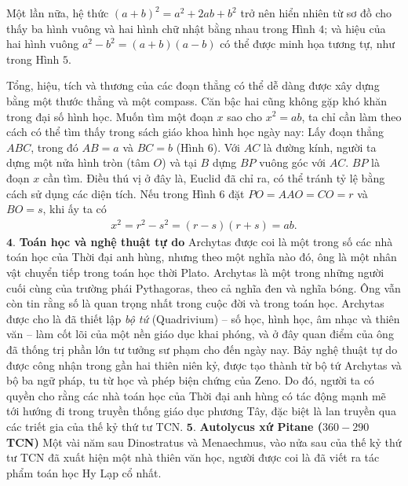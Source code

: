 \begin{multicols}{2}
	Một lần nữa, hệ thức $(a+ b)^2 = a^2 + 2ab + b^2$  trở nên hiển nhiên từ sơ đồ cho thấy ba hình vuông và hai hình chữ nhật bằng nhau trong Hình $4$; và hiệu của hai hình vuông $a^2 - b^2 = (a + b)(a-b)$  có thể được minh họa tương tự, như trong Hình $5$. 
	
	Tổng, hiệu, tích và thương của các đoạn thẳng có thể dễ dàng được xây dựng bằng một thước thẳng và một compass.  
	\vskip 0.1cm
	Căn bậc hai cũng không gặp khó khăn trong đại số hình học.  Muốn tìm một đoạn $x$  sao cho $x^2 = ab$, ta chỉ cần làm theo cách có thể tìm thấy trong sách giáo khoa hình học ngày nay: Lấy đoạn thẳng  $ABC$, trong đó $AB = a$  và $BC = b$  (Hình $6$). Với $AC$ là đường kính, người ta dựng một nửa hình tròn (tâm  $O$) và tại $B$  dựng  $BP$ vuông góc với $AC$. $BP$ là đoạn  $x$ cần tìm. 
	\vskip 0.1cm
	Điều thú vị ở đây là, Euclid đã chỉ ra, có thể tránh tỷ lệ bằng cách sử dụng các diện tích.
	\vskip 0.1cm
	Nếu trong Hình $6$ đặt $PO = AAO = CO =r$  và $BO = s$,  khi ấy ta có 
	\begin{align*}
		x^2 = r^2 - s^2 = (r-s)(r+s) = ab.
	\end{align*}
	$\pmb{4.}$ \textbf{\color{lichsutoanhoc}Toán học và nghệ thuật tự do} 
	\vskip 0.1cm
	Archytas được coi là một trong số các nhà toán học của Thời đại anh hùng, nhưng theo một nghĩa nào đó, ông là một nhân vật chuyển tiếp trong toán học thời Plato. 
	\vskip 0.1cm
	Archytas là một trong những người cuối cùng của trường phái Pythagoras, theo cả nghĩa đen và nghĩa bóng. Ông vẫn còn tin rằng số là quan trọng nhất trong cuộc đời và trong toán học.
	\vskip 0.1cm 
	Archytas được cho là đã thiết lập \textit{bộ tứ} (Quadrivium) -- số học, hình học, âm nhạc và thiên văn -- làm cốt lõi của một nền giáo dục khai phóng, và ở đây quan điểm của ông đã thống trị phần lớn tư tưởng sư phạm cho đến ngày nay.
	\vskip 0.1cm
	Bảy nghệ thuật tự do được công nhận trong gần hai thiên niên kỷ, được tạo thành từ bộ tứ Archytas và bộ ba ngữ pháp, tu từ học và phép biện chứng của Zeno. Do đó, người ta có quyền cho rằng các nhà toán học của Thời đại anh hùng có tác động mạnh mẽ tới hướng đi trong truyền thống giáo dục phương Tây, đặc biệt là lan truyền qua các triết gia của thế kỷ thứ tư TCN.
	\vskip 0.1cm
	$\pmb{5.}$ \textbf{\color{lichsutoanhoc}Autolycus xứ Pitane ($360-290$ TCN)}
	\vskip 0.1cm
	Một vài năm sau Dinostratus và Menaechmus, vào nửa sau của thế kỷ thứ tư TCN đã xuất hiện một nhà thiên văn học, người được coi là đã viết ra tác phẩm toán học Hy Lạp cổ nhất. 
	\vskip 0.1cm

\end{multicols}
